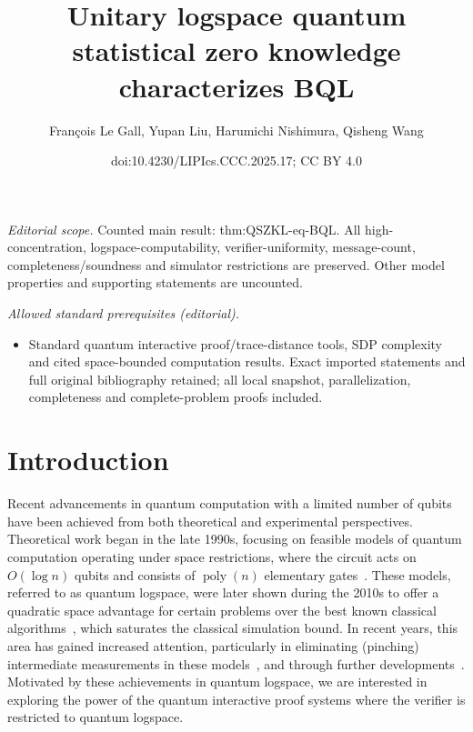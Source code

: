 \documentclass[10pt,a4paper]{article}
\title{Unitary logspace quantum statistical zero knowledge characterizes BQL}
\author{François Le Gall, Yupan Liu, Harumichi Nishimura, Qisheng Wang}
\date{doi:10.4230/LIPIcs.CCC.2025.17; CC BY 4.0}
\numberwithin{equation}{section}
\numberwithin{figure}{section}
\DeclareMathOperator\poly{poly}
\begin{document}
\maketitle
\noindent\textit{Editorial scope.} Counted main result: thm:QSZKL-eq-BQL. All high-concentration, logspace-computability, verifier-uniformity, message-count, completeness/soundness and simulator restrictions are preserved. Other model properties and supporting statements are uncounted.\par\medskip
\noindent\textit{Allowed standard prerequisites (editorial).}\begin{itemize}
\item Standard quantum interactive proof/trace-distance tools, SDP complexity and cited space-bounded computation results. Exact imported statements and full original bibliography retained; all local snapshot, parallelization, completeness and complete-problem proofs included.
\end{itemize}\medskip
\section{Introduction}

Recent advancements in quantum computation with a limited number of qubits have been achieved from both theoretical and experimental perspectives. Theoretical work began in the late 1990s, focusing on feasible models of quantum computation operating under space restrictions, where the circuit acts on $O(\log n)$ qubits and consists of $\poly(n)$ elementary gates~\cite{Wat99,Wat03}. These models, referred to as quantum logspace, were later shown during the 2010s to offer a quadratic space advantage for certain problems over the best known classical algorithms~\cite{TS13,FL18}, which saturates the classical simulation bound. In recent years, this area has gained increased attention, particularly in eliminating (pinching) intermediate measurements in these models~\cite{FR21,GRZ21}, and through further developments~\cite{GR22,Zhandry24}. Motivated by these achievements in quantum logspace, we are interested in exploring the power of the quantum interactive proof systems where the verifier is restricted to quantum logspace. 
\end{document}
